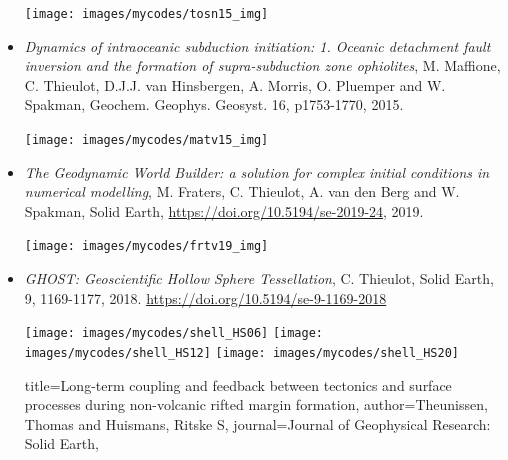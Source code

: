 \begin{itemize}
\begin{center}
\texttt{[image: images/mycodes/tosn15\_img]}
\end{center}


\item {\it Dynamics of intraoceanic subduction initiation: 1. Oceanic detachment fault inversion and the formation of supra-subduction zone ophiolites}, M. Maffione, C. Thieulot, D.J.J. van Hinsbergen, A. Morris, O. Pluemper and W. Spakman, Geochem. Geophys. Geosyst. 16, p1753-1770, 2015.

\begin{center}
\texttt{[image: images/mycodes/matv15\_img]}
\end{center}

\item {\it The Geodynamic World Builder: a solution for complex initial conditions in numerical modelling},
M. Fraters, C. Thieulot, A. van den Berg and W. Spakman,
Solid Earth, \url{https://doi.org/10.5194/se-2019-24}, 2019.

\begin{center}
\texttt{[image: images/mycodes/frtv19\_img]}
\end{center}


\end{itemize}


\begin{itemize}
\item {\it GHOST: Geoscientific Hollow Sphere Tessellation}, 
C. Thieulot, Solid Earth, 9, 1169-1177, 2018. \url{https://doi.org/10.5194/se-9-1169-2018}

\begin{center}
\texttt{[image: images/mycodes/shell\_HS06]}
\texttt{[image: images/mycodes/shell\_HS12]}
\texttt{[image: images/mycodes/shell\_HS20]}
\end{center}


title={Long-term coupling and feedback between tectonics and surface processes 
during non-volcanic rifted margin formation},
author={Theunissen, Thomas and Huismans, Ritske S},
journal={Journal of Geophysical Research: Solid Earth},

\end{itemize}

